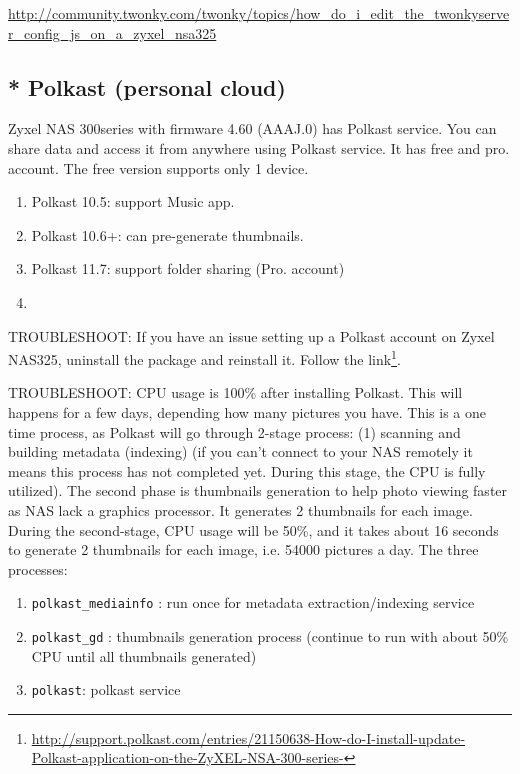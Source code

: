 \url{http://community.twonky.com/twonky/topics/how_do_i_edit_the_twonkyserver_config_js_on_a_zyxel_nsa325}

\subsection{* Polkast (personal cloud)}

Zyxel NAS 300series with firmware 4.60 (AAAJ.0) has Polkast service.
You can share data and access it from anywhere using Polkast service. It has
free and pro. account. The free version supports only 1 device.
\begin{enumerate}
  \item Polkast 10.5: support Music app.
  \item Polkast 10.6+: can pre-generate thumbnails.
  \item Polkast 11.7: support folder sharing (Pro. account)
  \item 
\end{enumerate}

TROUBLESHOOT: If you have an issue setting up a Polkast account on Zyxel NAS325,
uninstall the package and reinstall it. Follow the
link\footnote{\url{http://support.polkast.com/entries/21150638-How-do-I-install-update-Polkast-application-on-the-ZyXEL-NSA-300-series-}}.

TROUBLESHOOT: CPU usage is 100\% after installing Polkast. This will happens for
a few days, depending how many pictures you have. This is a one time process, as
Polkast will go through 2-stage process: (1) scanning and building metadata
(indexing) (if you can't connect to your NAS remotely it means this process has
not completed yet. During this stage, the CPU is fully utilized). The second
phase is thumbnails generation to help photo viewing faster as NAS lack a
graphics processor. It generates 2 thumbnails for each image. During the
second-stage, CPU usage will be 50\%, and it takes about 16 seconds to generate
2 thumbnails for each image, i.e. 54000 pictures a day. The three processes:
\begin{enumerate}
  \item \verb!polkast_mediainfo! : run once for metadata extraction/indexing
  service
  \item \verb!polkast_gd! : thumbnails generation process (continue to run with
  about 50\% CPU until all thumbnails generated)
  \item \verb!polkast!: polkast service
\end{enumerate}

